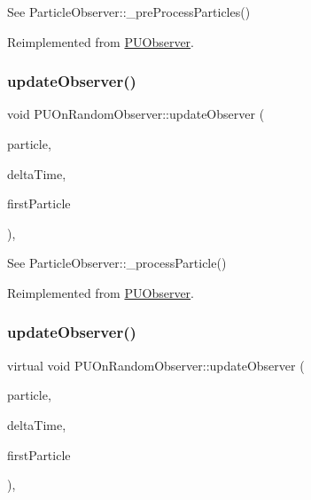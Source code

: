 See Particle\+Observer\+::\+\_\+pre\+Process\+Particles() 

Reimplemented from \hyperlink{classPUObserver}{P\+U\+Observer}.

\mbox{\label{classPUOnRandomObserver_ab187851f52f9a0aa125ed8f8799b1f75}} 
\subsubsection{\texorpdfstring{update\+Observer()}{updateObserver()}\hspace{0.1cm}{\footnotesize\ttfamily [1/2]}}
{\footnotesize\ttfamily void P\+U\+On\+Random\+Observer\+::update\+Observer (\begin{DoxyParamCaption}\item[{\hyperlink{structPUParticle3D}{P\+U\+Particle3D} $\ast$}]{particle,  }\item[{float}]{delta\+Time,  }\item[{bool}]{first\+Particle }\end{DoxyParamCaption})\hspace{0.3cm}{\ttfamily [override]}, {\ttfamily [virtual]}}

See Particle\+Observer\+::\+\_\+process\+Particle() 

Reimplemented from \hyperlink{classPUObserver}{P\+U\+Observer}.

\mbox{\label{classPUOnRandomObserver_a273c5e6fe5152c025c098a51f4df6b63}} 
\subsubsection{\texorpdfstring{update\+Observer()}{updateObserver()}\hspace{0.1cm}{\footnotesize\ttfamily [2/2]}}
{\footnotesize\ttfamily virtual void P\+U\+On\+Random\+Observer\+::update\+Observer (\begin{DoxyParamCaption}\item[{\hyperlink{structPUParticle3D}{P\+U\+Particle3D} $\ast$}]{particle,  }\item[{float}]{delta\+Time,  }\item[{bool}]{first\+Particle }\end{DoxyParamCaption})\hspace{0.3cm}{\ttfamily [override]}, {\ttfamily [virtual]}}

